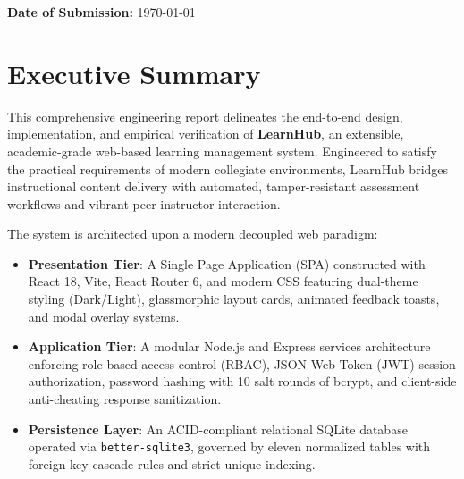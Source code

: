 \documentclass[12pt,a4paper]{report}
\begin{document}
\begin{titlepage}
\begin{center}
        \vfill
        {\large \textbf{Date of Submission:} \today}
    \end{center}
\end{titlepage}


\chapter*{Executive Summary}

This comprehensive engineering report delineates the end-to-end design, implementation, and empirical verification of \textbf{LearnHub}, an extensible, academic-grade web-based learning management system. Engineered to satisfy the practical requirements of modern collegiate environments, LearnHub bridges instructional content delivery with automated, tamper-resistant assessment workflows and vibrant peer-instructor interaction.

The system is architected upon a modern decoupled web paradigm:
\begin{itemize}[itemsep=4pt]
    \item \textbf{Presentation Tier}: A Single Page Application (SPA) constructed with React 18, Vite, React Router 6, and modern CSS featuring dual-theme styling (Dark/Light), glassmorphic layout cards, animated feedback toasts, and modal overlay systems.
    \item \textbf{Application Tier}: A modular Node.js and Express services architecture enforcing role-based access control (RBAC), JSON Web Token (JWT) session authorization, password hashing with 10 salt rounds of bcrypt, and client-side anti-cheating response sanitization.
    \item \textbf{Persistence Layer}: An ACID-compliant relational SQLite database operated via \texttt{better-sqlite3}, governed by eleven normalized tables with foreign-key cascade rules and strict unique indexing.
\end{itemize}
\end{document}
